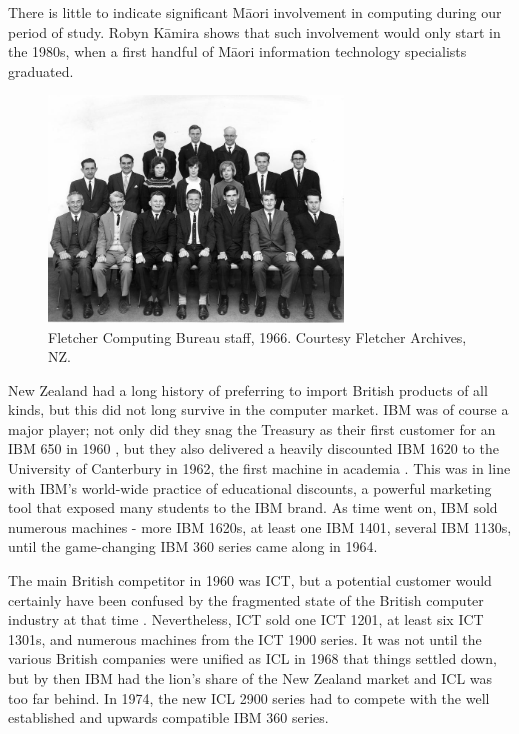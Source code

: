 \documentclass{IEEEcsmag}
\begin{document}
There is little to indicate significant Māori involvement in computing during our period of study.
Robyn Kāmira \cite{Kamira} shows that such involvement would only start in the 1980s, when a first handful
of Māori information technology specialists graduated.

\begin{figure}
\centerline{\includegraphics[width=18.5pc]{FletcherStaff1966.jpg}}
\caption{\label{Staff1966}Fletcher Computing Bureau staff, 1966. Courtesy Fletcher Archives, NZ.}\vspace*{-5pt}
\end{figure}

New Zealand had a long history of preferring to import British products of all kinds, but this did not long survive in the computer market. IBM was of course a major player; not only did they snag the Treasury as their first customer for an IBM 650 in 1960 \cite{FirstCinNZ}, but they also delivered a heavily discounted IBM 1620 to the University of Canterbury in 1962, the first machine in academia \cite{Dale-Canty2}. This was in line with IBM's world-wide practice of educational discounts, a powerful marketing tool that exposed many students to the IBM brand. As time went on, IBM sold numerous machines - more IBM 1620s, at least one IBM 1401, several IBM 1130s, until the game-changing IBM 360 series came along in 1964.

The main British competitor in 1960 was ICT, but a potential customer would certainly have been confused by the fragmented state of the British computer industry at that time \cite{Hendry-1989}.
Nevertheless, ICT sold one ICT 1201, at least six ICT 1301s, and numerous machines from the ICT 1900 series.
It was not until the various British companies were unified as ICL in 1968 that things settled down, but by then IBM had the lion's share of the New Zealand market and ICL was too far behind. In 1974, the new ICL 2900 series had to compete with the well established and upwards compatible IBM 360 series.
\end{document}
